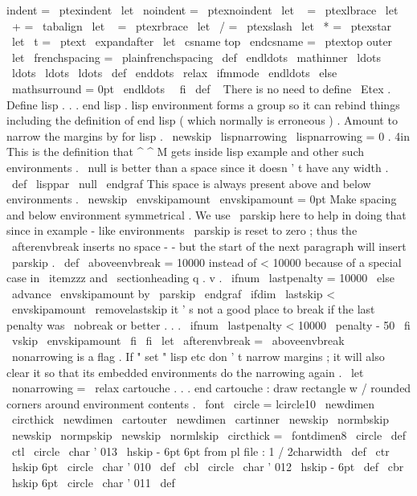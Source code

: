 {{{{{indent
=
\
ptexindent
\
let
\
noindent
=
\
ptexnoindent
\
let
\
{
=
\
ptexlbrace
\
let
\
+
=
\
tabalign
\
let
\
}
=
\
ptexrbrace
\
let
\
/
=
\
ptexslash
\
let
\
*
=
\
ptexstar
\
let
\
t
=
\
ptext
\
expandafter
\
let
\
csname
top
\
endcsname
=
\
ptextop
%
outer
\
let
\
frenchspacing
=
\
plainfrenchspacing
%
\
def
\
endldots
{
\
mathinner
{
\
ldots
\
ldots
\
ldots
\
ldots
}
}
%
\
def
\
enddots
{
\
relax
\
ifmmode
\
endldots
\
else
\
mathsurround
=
0pt
\
endldots
\
\
fi
}
%
\
def
\
{
}
%
}
%
There
is
no
need
to
define
\
Etex
.
%
Define
lisp
.
.
.
end
lisp
.
%
lisp
environment
forms
a
group
so
it
can
rebind
things
%
including
the
definition
of
end
lisp
(
which
normally
is
erroneous
)
.
%
Amount
to
narrow
the
margins
by
for
lisp
.
\
newskip
\
lispnarrowing
\
lispnarrowing
=
0
.
4in
%
This
is
the
definition
that
^
^
M
gets
inside
lisp
example
and
other
%
such
environments
.
\
null
is
better
than
a
space
since
it
doesn
'
t
%
have
any
width
.
\
def
\
lisppar
{
\
null
\
endgraf
}
%
This
space
is
always
present
above
and
below
environments
.
\
newskip
\
envskipamount
\
envskipamount
=
0pt
%
Make
spacing
and
below
environment
symmetrical
.
We
use
\
parskip
here
%
to
help
in
doing
that
since
in
example
-
like
environments
\
parskip
%
is
reset
to
zero
;
thus
the
\
afterenvbreak
inserts
no
space
-
-
but
the
%
start
of
the
next
paragraph
will
insert
\
parskip
.
%
\
def
\
aboveenvbreak
{
{
%
%
=
10000
instead
of
<
10000
because
of
a
special
case
in
\
itemzzz
and
%
\
sectionheading
q
.
v
.
\
ifnum
\
lastpenalty
=
10000
\
else
\
advance
\
envskipamount
by
\
parskip
\
endgraf
\
ifdim
\
lastskip
<
\
envskipamount
\
removelastskip
%
it
'
s
not
a
good
place
to
break
if
the
last
penalty
was
\
nobreak
%
or
better
.
.
.
\
ifnum
\
lastpenalty
<
10000
\
penalty
-
50
\
fi
\
vskip
\
envskipamount
\
fi
\
fi
}
}
\
let
\
afterenvbreak
=
\
aboveenvbreak
%
\
nonarrowing
is
a
flag
.
If
"
set
"
lisp
etc
don
'
t
narrow
margins
;
it
will
%
also
clear
it
so
that
its
embedded
environments
do
the
narrowing
again
.
\
let
\
nonarrowing
=
\
relax
%
cartouche
.
.
.
end
cartouche
:
draw
rectangle
w
/
rounded
corners
around
%
environment
contents
.
\
font
\
circle
=
lcircle10
\
newdimen
\
circthick
\
newdimen
\
cartouter
\
newdimen
\
cartinner
\
newskip
\
normbskip
\
newskip
\
normpskip
\
newskip
\
normlskip
\
circthick
=
\
fontdimen8
\
circle
%
\
def
\
ctl
{
{
\
circle
\
char
'
013
\
hskip
-
6pt
}
}
%
6pt
from
pl
file
:
1
/
2charwidth
\
def
\
ctr
{
{
\
hskip
6pt
\
circle
\
char
'
010
}
}
\
def
\
cbl
{
{
\
circle
\
char
'
012
\
hskip
-
6pt
}
}
\
def
\
cbr
{
{
\
hskip
6pt
\
circle
\
char
'
011
}
}
\
def
}}}}
